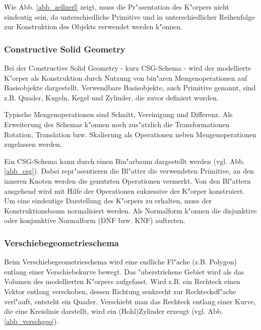 {Wie Abb. \ref{abb_zellzerl} zeigt, muss die Pr"asentation des K"orpers nicht 
eindeutig sein, da unterschiedliche Primitive und in unterschiedlicher 
Reihenfolge zur Konstruktion des Objekts verwendet werden k"onnen.  

\subsubsection{Constructive Solid Geometry}
{
\let\mywidth=\linewidth
\parbox[t]{0.37\mywidth}{%
    Bei der Constructive Solid Geometry - kurz CSG-Schema - wird der 
    modellierte K"orper als Konstruktion durch Nutzung von bin"aren 
    Mengenoperationen auf Basisobjekte dargestellt. 
    Verwendbare Basisobjekte, auch Primitive genannt, sind z.B. Quader, 
    Kugeln, Kegel und Zylinder, die zuvor definiert wurden. 
}
\hspace{1em}
\parbox[t][4.5cm][c]{0.58\mywidth}{\begin{center}
    \end{center}}
}

Typische Mengenoperationen sind Schnitt, Vereinigung und Differenz.
Als Erweiterung des Schemas k"onnen noch zus"atzlich die Transformationen 
Rotation, Translation bzw. Skalierung als Operationen neben 
Mengenoperationen zugelassen werden. 

Ein CSG-Schema kann durch einen Bin"arbaum dargestellt werden (vgl. 
Abb. \ref{abb_csg}). 
Dabei repr"asentieren die Bl"atter die verwendeten Primitive, an den 
inneren Knoten werden die genutzten Operationen vermerkt. 
Von den Bl"attern ausgehend wird mit Hilfe der Operationen sukzessive 
der K"orper konstruiert. 
Um eine eindeutige Darstellung des K"orpers zu erhalten, muss der 
Konstruktionsbaum normalisiert werden. Als Normalform k"onnen die disjunktive
oder konjunktive Normalform (DNF bzw. KNF) auftreten. 

\subsubsection{Verschiebegeometrieschema}
\label{vschiebgeom}
{
\let\mywidth=\linewidth
\parbox[t]{0.62\mywidth}{%
Beim Verschiebegeometrieschema wird eine endliche Fl"ache (z.B. Polygon)
entlang einer Verschiebekurve bewegt. 
Das "uberstrichene Gebiet wird als das Volumen des modellierten K"orpers 
aufgefasst. Wird z.B. ein Rechteck einen Vektor
entlang verschoben, dessen Richtung senkrecht zur Rechtecksfl"ache verl"auft,
entsteht ein Quader. 
Verschiebt man das Rechteck entlang einer Kurve, die
eine Kreislinie darstellt, wird ein (Hohl)Zylinder erzeugt (vgl. Abb.  
\ref{abb_verschgeo}).
}
\hspace{1em}
\parbox[t][4cm][c]{0.33\mywidth}{}
}

}
